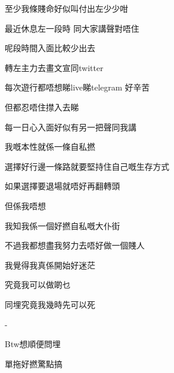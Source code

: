 至少我條賤命好似叫付出左少少咁

最近休息左一段時 同大家講聲對唔住

呢段時間入面比較少出去

轉左主力去畫文宣同twitter

每次遊行都唔想睇live睇telegram 好辛苦

但都忍唔住㩒入去睇

每一日心入面好似有另一把聲同我講

我嘅本性就係一條自私撚

選擇好行邊一條路就要堅持住自己嘅生存方式

如果選擇要退場就唔好再翻轉頭

但係我唔想

我知我係一個好撚自私嘅大仆街

不過我都想盡我努力去唔好做一個賤人

我覺得我真係開始好迷茫

究竟我可以做啲乜

同埋究竟我幾時先可以死

-

Btw想順便問埋

單拖好撚驚點搞

